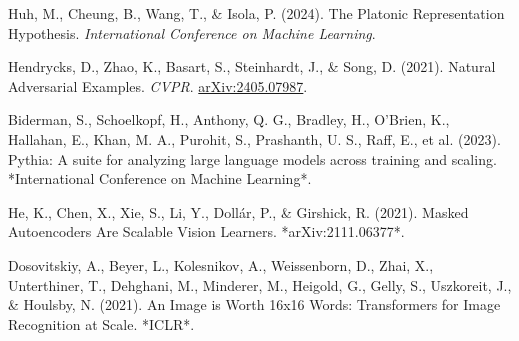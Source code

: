\documentclass[10pt,a4paper]{article}
\begin{document}
\begin{thebibliography}{9}

Huh, M., Cheung, B., Wang, T., \& Isola, P. (2024). The Platonic Representation Hypothesis. \emph{International Conference on Machine Learning}.

Hendrycks, D., Zhao, K., Basart, S., Steinhardt, J., \& Song, D. (2021). Natural Adversarial Examples. \emph{CVPR}. \href{https://arxiv.org/abs/2405.07987}{arXiv:2405.07987}.

Biderman, S., Schoelkopf, H., Anthony, Q. G., Bradley, H., O'Brien, K., Hallahan, E., Khan, M. A., Purohit, S., Prashanth, U. S., Raff, E., et al. (2023). Pythia: A suite for analyzing large language models across training and scaling. *International Conference on Machine Learning*.

He, K., Chen, X., Xie, S., Li, Y., Doll{\'a}r, P., \& Girshick, R. (2021). Masked Autoencoders Are Scalable Vision Learners. *arXiv:2111.06377*.

Dosovitskiy, A., Beyer, L., Kolesnikov, A., Weissenborn, D., Zhai, X., Unterthiner, T., Dehghani, M., Minderer, M., Heigold, G., Gelly, S., Uszkoreit, J., \& Houlsby, N. (2021). An Image is Worth 16x16 Words: Transformers for Image Recognition at Scale. *ICLR*.

\end{thebibliography}
\end{document}
